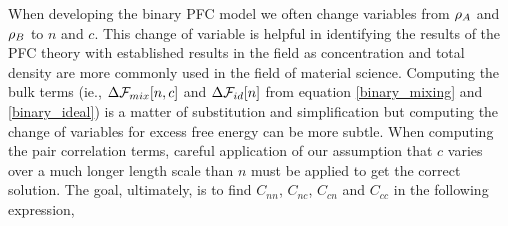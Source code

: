 When developing the binary PFC model we often change variables from $\rho_A$ and
$\rho_B$ to $n$ and $c$.  This change of variable is helpful in identifying the
results of the PFC theory with established results in the field as
concentration and total density are more commonly used in the field of material
science. Computing the bulk terms (ie., $\Delta\mathcal{F}_{mix}[n, c]$ and
$\Delta\mathcal{F}_{id}[n]$ from equation \ref{binary_mixing} and \ref{binary_ideal}) is
a matter of substitution and simplification but computing the change of variables for excess free
energy can be more subtle. When computing the pair correlation
terms, careful application of our assumption that $c$ varies over a much longer
length scale than $n$ must be applied to get the correct solution. The goal,
ultimately, is to find $C_{n n}$, $C_{n c}$, $C_{c n}$ and $C_{c c}$ in the
following expression, 

